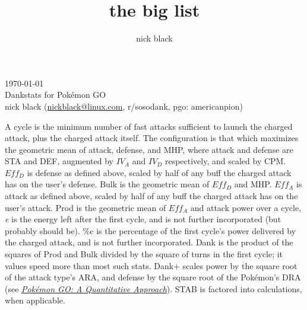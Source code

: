 \documentclass[ebook,10pt,openany,oneside]{memoir}
\title{the big list}
\author{nick black}
\begin{document}
\noindent{}\today\\
Dankstats for Pokémon GO\\
nick black (\href{mailto:nickblack@linux.com}{nickblack@linux.com}, r/sosodank, pgo: americanpion)\\
\bigskip

A cycle is the minimum number of fast attacks sufficient to launch the charged attack, plus the charged attack itself.
The configuration is that which maximizes the geometric mean of attack, defense, and MHP, where attack and defense are STA and DEF, augmented by $IV_A$ and $IV_D$ respectively, and scaled by CPM.
$Eff_D$ is defense as defined above, scaled by half of any buff the charged attack has on the user's defense.
Bulk is the geometric mean of $Eff_D$ and MHP.
$Eff_A$ is attack as defined above, scaled by half of any buff the charged attack has on the user's attack.
Prod is the geometric mean of $Eff_A$ and attack power over a cycle,
\textit{e} is the energy left after the first cycle, and is not further incorporated (but probably should be).
\%c is the percentage of the first cycle's power delivered by the charged attack, and is not further incorporated.
Dank is the product of the squares of Prod and Bulk divided by the square of turns in the first cycle; it values speed more than most such stats.
Dank+ scales power by the square root of the attack type's ARA, and defense by the square root of the Pokémon's DRA (see \textit{\href{https://nick-black.com/pgo-quantitative.pdf}{Pokémon GO: A Quantitative Approach}}).
STAB is factored into calculations, when applicable.
\bigskip

\footnotesize
\setlength{\tabcolsep}{2pt}



\end{document}
